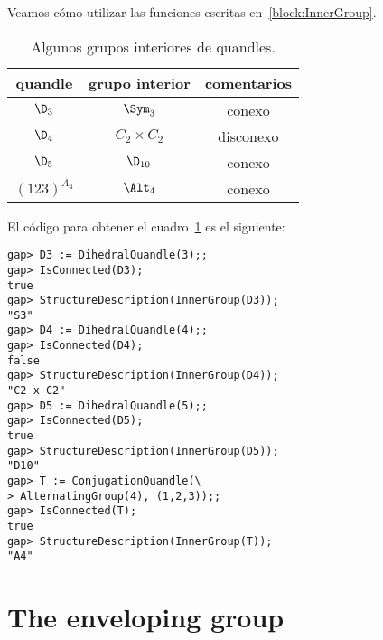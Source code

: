 \begin{examples}
Veamos cómo utilizar las funciones escritas
en~\ref{block:InnerGroup}.  

\begin{table}[H]
	\centering
	\begin{tabular}{|c|c|c|}
		\hline 
		quandle & grupo interior & comentarios\tabularnewline
		\hline 
		$\D_{3}$ & $\Sym_{3}$ & conexo\tabularnewline
		$\D_{4}$ & $C_2\times C_2$ & disconexo\tabularnewline
		$\D_{5}$ & $\D_{10}$ & conexo\tabularnewline
		$(123)^{A_{4}}$ & $\Alt_{4}$ & conexo\tabularnewline
		\hline 
	\end{tabular}
    \caption{Algunos grupos interiores de quandles.}
    \label{tab:interiores}
\end{table}
\noindent El código para obtener el cuadro~\ref{tab:interiores} es
el siguiente:
\begin{lstlisting}
gap> D3 := DihedralQuandle(3);;
gap> IsConnected(D3);
true
gap> StructureDescription(InnerGroup(D3));
"S3"
gap> D4 := DihedralQuandle(4);;
gap> IsConnected(D4);
false
gap> StructureDescription(InnerGroup(D4));
"C2 x C2"
gap> D5 := DihedralQuandle(5);;
gap> IsConnected(D5);
true
gap> StructureDescription(InnerGroup(D5));
"D10"
gap> T := ConjugationQuandle(\
> AlternatingGroup(4), (1,2,3));;
gap> IsConnected(T);
true
gap> StructureDescription(InnerGroup(T));
"A4"
\end{lstlisting}
\end{examples}

\section{The enveloping group}


